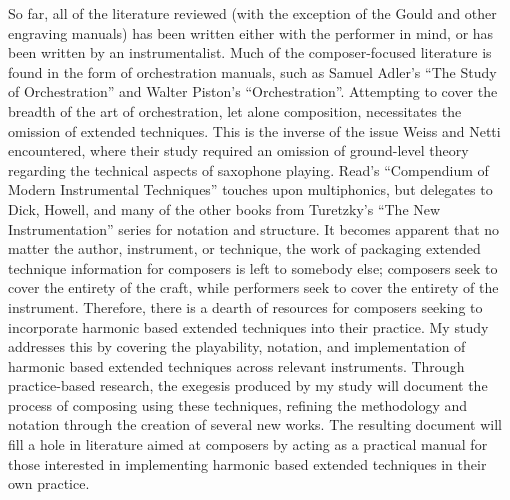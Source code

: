 So far, all of the literature reviewed (with the exception of the Gould and other engraving manuals) has been written either with the performer in mind, or has been written by an instrumentalist. Much of the composer-focused literature is found in the form of orchestration manuals, such as Samuel Adler’s “The Study of Orchestration” and Walter Piston’s “Orchestration”.\autocite{adlerStudyOrchestration2002, pistonOrchestration1969}  Attempting to cover the breadth of the art of orchestration, let alone composition, necessitates the omission of extended techniques. This is the inverse of the issue Weiss and Netti encountered, where their study required an omission of ground-level theory regarding the technical aspects of saxophone playing. Read’s “Compendium of Modern Instrumental Techniques” touches upon multiphonics, but delegates to Dick, Howell, and many of the other books from Turetzky’s “The New Instrumentation” series for notation and structure.\autocite[160]{readCompendiumModernInstrumental1993}  It becomes apparent that no matter the author, instrument, or technique, the work of packaging extended technique information for composers is left to somebody else; composers seek to cover the entirety of the craft, while performers seek to cover the entirety of the instrument. Therefore, there is a dearth of resources for composers seeking to incorporate harmonic based extended techniques into their practice. My study addresses this by covering the playability, notation, and implementation of harmonic based extended techniques across relevant instruments. Through practice-based research, the exegesis produced by my study will document the process of composing using these techniques, refining the methodology and notation through the creation of several new works. The resulting document will fill a hole in literature aimed at composers by acting as a practical manual for those interested in implementing harmonic based extended techniques in their own practice.




